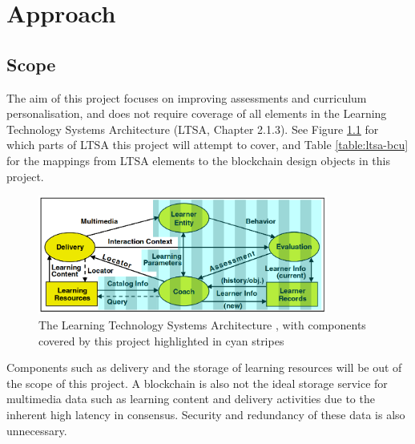 \chapter{Approach}
\graphicspath{{Chapter3/Figs/Raster/}{Chapter3/Figs/}}

\section{Scope}

The aim of this project focuses on improving assessments and curriculum personalisation, and does not require 
coverage of all elements in the Learning Technology Systems Architecture (LTSA, Chapter 2.1.3). 
See Figure \ref{fig:ltsa-covered} for which parts of LTSA this project will attempt to cover, and 
Table \ref{table:ltsa-bcu} for the mappings from LTSA elements to the blockchain design objects in this project.

\begin{figure}[!ht] 
    \centering    
    \includegraphics[width=0.85\textwidth]{ltsa-covered}
    \caption[Design Coverage of LTSA]
        {The Learning Technology Systems Architecture \citep{ieee2003ltsa}, 
        with components covered by this project highlighted in cyan stripes} 
    \label{fig:ltsa-covered}
\end{figure}

Components such as delivery and the storage of learning resources will be out of the scope of this project. 
A blockchain is also not the ideal storage service for multimedia data such as learning content and delivery activities 
due to the inherent high latency in consensus. Security and redundancy of these data is also unnecessary. 

